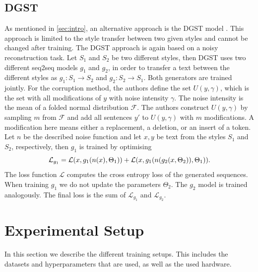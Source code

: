 \documentclass[twocolumn]{tum-article}
\begin{document}
\subsection{DGST}\label{sec:dgst}
As mentioned in \autoref{sec:intro}, an alternative approach is the DGST model \cite{li2020dgst}. This approach is limited to the style transfer between two given styles and cannot be changed after training. The DGST approach is again based on a noisy reconstruction task. Let $S_1$ and $S_2$ be two different styles, then DGST uses two different seq2seq models $g_1$ and $g_2$, in order to transfer a text between the different styles as $g_1: S_1 \rightarrow S_2$ and $g_2: S_2 \rightarrow S_1$. Both generators are trained jointly. For the corruption method, the authors define the set $U(y, \gamma)$, which is the set with all modifications of $y$ with noise intensity $\gamma$. The noise intensity is the mean of a folded normal distribution $\mathcal{F}$. The authors construct $U(y, \gamma)$ by sampling $m$ from $\mathcal{F}$ and add all sentences $y'$ to $U(y, \gamma)$ with $m$ modifications. A modification here means either a replacement, a deletion, or an insert of a token. Let $n$ be the described noise function and let $x, y$ be text from the styles $S_1$ and $S_2$, respectively, then $g_1$ is trained by optimising 
$$
\mathcal{L}_{g_1} = \mathcal{L}(x, g_1(n(x), \Theta_1)) + \mathcal{L}(x, g_1(n(g_2(x, \Theta_2)), \Theta_1))\textnormal{.}
$$
The loss function $\mathcal{L}$ computes the cross entropy loss of the generated sequences. When training $g_1$ we do not update the parameters $\Theta_2$. The $g_2$ model is trained analogously. The final loss is the sum of $\mathcal{L}_{g_1}$ and $\mathcal{L}_{g_2}$.
\section{Experimental Setup}\label{sec:experiment_setup}
In this section we describe the different training setups. This includes the datasets and hyperparameters that are used, as well as the used hardware.
\end{document}

